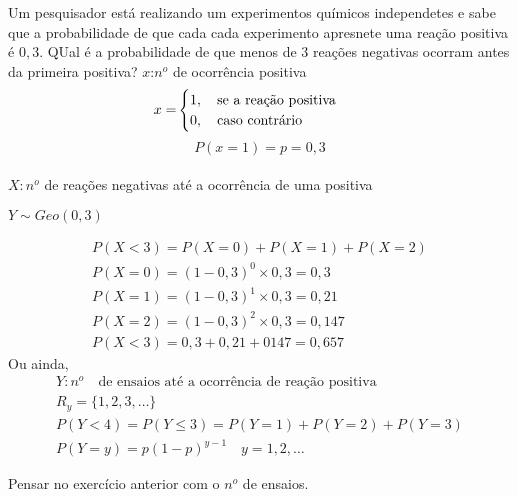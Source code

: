 \begin{description}
    \begin{example}Um pesquisador está realizando um experimentos químicos independetes 
      e sabe que a probabilidade de que cada cada experimento apresnete uma reação 
      positiva é $0,3$. QUal é a probabilidade de que menos de 3 reações negativas 
      ocorram antes da primeira positiva?
      $x$:$n^o$ de ocorrência positiva 
      \begin{align*}
        x=&\begin{cases}
          1, \text{\quad se a reação positiva}\\
          0, \text{\quad caso contrário}
        \end{cases}
      \end{align*}
      $$P(x=1)=p=0,3$$\\
      $X: n^o$ de reações negativas até a ocorrência de uma positiva\\
    \begin{center}$Y \sim Geo(0,3)$\end{center}
      \begin{align*}
        P(X<3)=P(X=0)+P(X=1)+P(X=2)\\
        P(X=0)=(1-0,3)^0 \times 0,3 = 0,3\\
        P(X=1)=(1-0,3)^1 \times 0,3 = 0,21\\
        P(X=2)=(1-0,3)^2 \times 0,3 = 0,147\\
        P(X<3)=0,3+0,21+0147=0,657
      \end{align*}
      Ou ainda,
      \begin{align*}
        Y: n^o \quad \text{de ensaios até a ocorrência de reação positiva}\\
        R_y = \{ 1,2,3,\ldots \}\\
        P( Y<4 ) = P (Y \leq 3) = P(Y=1)+ P(Y=2)+P(Y=3)\\
        P(Y=y)= p(1-p)^{y-1} \quad y=1,2,\dots
      \end{align*}
    \end{example}
    \begin{exercise} Pensar no exercício anterior com o $n^o$ de ensaios.
  \end{exercise}
  \end{description}
